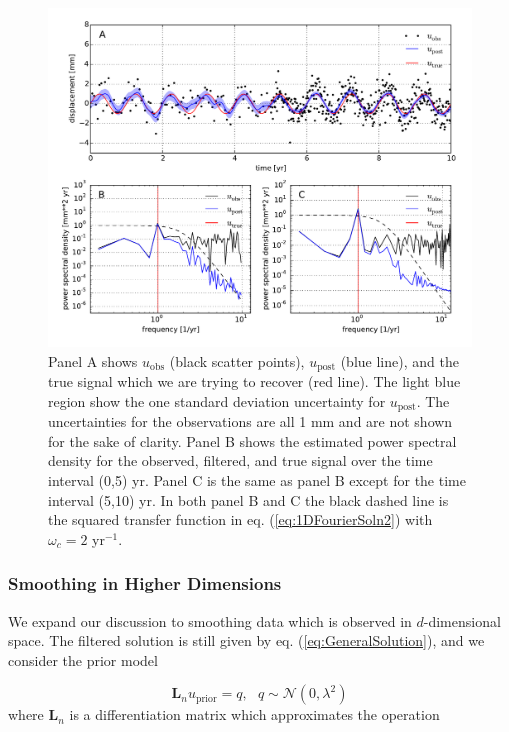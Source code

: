 \documentclass[10pt,a4paper]{article}
\begin{document}
\begin{figure}
\includegraphics[scale=0.7]{figures/fig2}
\caption{Panel A shows $u_\mathrm{obs}$ (black scatter points), $u_\mathrm{post}$ (blue line), and the true signal which we are trying to recover (red line).  The light blue region show the one standard deviation uncertainty for $u_\mathrm{post}$. The uncertainties for the observations are all 1 mm and are not shown for the sake of clarity.  Panel B shows the estimated power spectral density for the observed, filtered, and true signal over the time interval (0,5) yr. Panel C is the same as panel B except for the time interval (5,10) yr.  In both panel B and C the black dashed line is the squared transfer function in eq. (\ref{eq:1DFourierSoln2}) with $\omega_c=2$ yr$^{-1}$.}   
\label{fig:Demo2}
\end{figure}

\subsubsection{Smoothing in Higher Dimensions} 
We expand our discussion to smoothing data which is observed in $d$-dimensional space.  The filtered solution is still given by eq. (\ref{eq:GeneralSolution}), and we consider the prior model

\begin{equation}
  \mathbf{L}_n u_\mathrm{prior} = q, \ \ \ q \sim \mathcal{N}(0,\lambda^2)
\end{equation}  
where $\mathbf{L}_n$ is a differentiation matrix which approximates the operation 
\end{document}
